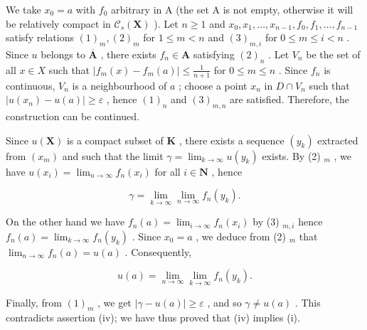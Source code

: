 We take \(x_0 = a\) with \(f_0\) arbitrary in A (the set A is not empty, otherwise it will be relatively compact in \(\mathcal{C}_s(\mathbf{X})\) ). Let \(n \geqslant 1\) and \(x_0, x_1, \ldots, x_{n-1}, f_0, f_1, \ldots, f_{n-1}\) satisfy relations \((1)_m, (2)_m\) for \(1 \leqslant m < n\) and \((3)_{m,i}\) for \(0 \leqslant m \leqslant i < n\) . Since \(u\) belongs to \(\overline{\mathbf{A}}\) , there exists \(f_n \in \mathbf{A}\) satisfying \((2)_n\) . Let \(V_n\) be the set of all \(x \in X\) such that \(|f_m(x) - f_m(a)| \leqslant \frac{1}{n+1}\) for \(0 \leqslant m \leqslant n\) . Since \(f_n\) is continuous, \(V_n\) is a neighbourhood of \(a\) ; choose a point \(x_n\) in \(D \cap V_n\) such that \(|u(x_n) - u(a)| \geqslant \varepsilon\) , hence \((1)_n\) and \((3)_{m,n}\) are satisfied. Therefore, the construction can be continued.

Since \(u(\mathbf{X})\) is a compact subset of \(\mathbf{K}\) , there exists a sequence \((y_k)\) extracted from \((x_m)\) and such that the limit \(\gamma = \lim_{k\to \infty}u(y_k)\) exists. By (2) \(_m\) , we have \(u(x_i) = \lim_{n\to \infty}f_n(x_i)\) for all \(i\in \mathbf{N}\) , hence

\[
\gamma = \lim _ {k \rightarrow \infty} \lim _ {n \rightarrow \infty} f _ {n} (y _ {k}).\tag{4}
\]

On the other hand we have \(f_{n}(a) = \lim_{i\to \infty}f_{n}(x_{i})\) by (3) \(_{m,i}\) hence \(f_{n}(a) = \lim_{k\to \infty}f_{n}(y_{k})\) . Since \(x_0 = a\) , we deduce from (2) \(_{m}\) that \(\lim_{n\to \infty}f_n(a) = u(a)\) . Consequently,

\[
u (a) = \lim _ {n \rightarrow \infty} \lim _ {k \rightarrow \infty} f _ {n} (y _ {k}).\tag{5}
\]

Finally, from \((1)_{m}\) , we get \(|\gamma - u(a)| \geqslant \varepsilon\) , and so \(\gamma \neq u(a)\) . This contradicts assertion (iv); we have thus proved that (iv) implies (i).

